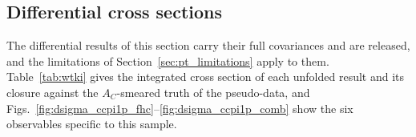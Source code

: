 \documentclass[11pt,a4paper]{article}
\begin{document}

\subsection{Differential cross sections}
\label{sec:pt_diff}
\label{sec:pt_validation_only}

The differential results of this section carry their full covariances
and are released, and the limitations of Section~\ref{sec:pt_limitations} apply to them. Table~\ref{tab:wtki} gives the
integrated cross section of each unfolded result and its closure against the $A_C$-smeared truth of
the pseudo-data, and Figs.~\ref{fig:dsigma_ccpi1p_fhc}--\ref{fig:dsigma_ccpi1p_comb} show the six
observables specific to this sample.
\end{document}
